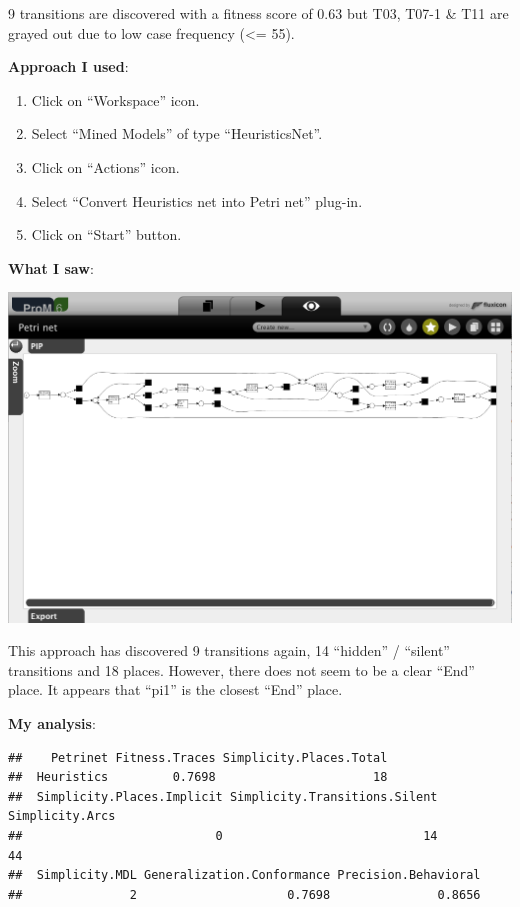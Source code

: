 \documentclass[]{article}
\begin{document}
9 transitions are discovered with a fitness score of 0.63 but T03, T07-1
\& T11 are grayed out due to low case frequency (\textless{}= 55).

\textbf{Approach I used}:

\begin{enumerate}
\def\labelenumi{\arabic{enumi}.}
\setcounter{enumi}{19}
\itemsep1pt\parskip0pt
\item
  Click on ``Workspace'' icon.
\item
  Select ``Mined Models'' of type ``HeuristicsNet''.
\item
  Click on ``Actions'' icon.
\item
  Select ``Convert Heuristics net into Petri net'' plug-in.
\item
  Click on ``Start'' button.
\end{enumerate}

\textbf{What I saw}:

\includegraphics{CoSeLoG_Step_05_Filter96_PetriNet_Heuristics.png}

This approach has discovered 9 transitions again, 14 ``hidden'' /
``silent'' transitions and 18 places. However, there does not seem to be
a clear ``End'' place. It appears that ``pi1'' is the closest ``End''
place.

\textbf{My analysis}:

\begin{verbatim}
##    Petrinet Fitness.Traces Simplicity.Places.Total
##  Heuristics         0.7698                      18
##  Simplicity.Places.Implicit Simplicity.Transitions.Silent Simplicity.Arcs
##                           0                            14              44
##  Simplicity.MDL Generalization.Conformance Precision.Behavioral
##               2                     0.7698               0.8656
\end{verbatim}
\end{document}
